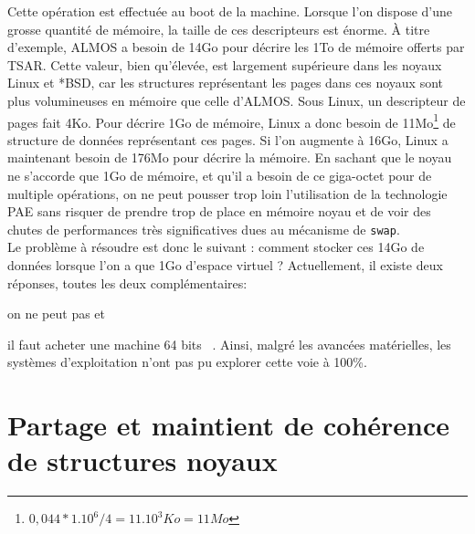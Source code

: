       Cette opération est effectuée au boot de la machine. Lorsque l’on dispose
      d’une grosse quantité de mémoire, la taille de ces descripteurs est
      énorme. À titre d’exemple, ALMOS a besoin de 14Go pour décrire les 1To de
      mémoire offerts par TSAR. Cette valeur, bien qu’élevée, est largement
      supérieure dans les noyaux Linux et *BSD, car les structures représentant
      les pages dans ces noyaux sont plus volumineuses en mémoire que celle
      d’ALMOS. Sous Linux, un descripteur de pages fait 4Ko. Pour décrire 1Go de
      mémoire, Linux a donc besoin de 11Mo\footnote{$0,044*1.10^6/4 = 11.10^3Ko
        = 11Mo$} de structure de données représentant ces pages. Si l'on
      augmente à 16Go, Linux a maintenant besoin de 176Mo pour décrire la
      mémoire. En sachant que le noyau ne s'accorde que 1Go de mémoire, et qu'il
      a besoin de ce giga-octet pour de multiple opérations, on ne peut pousser
      trop loin l'utilisation de la technologie PAE sans risquer de prendre trop
      de place en mémoire noyau et de voir des chutes de performances très
      significatives dues au mécanisme de \texttt{swap}.\\

      Le problème à résoudre est donc le suivant : comment stocker ces 14Go de
      données lorsque l’on a que 1Go d’espace virtuel ?  Actuellement, il existe
      deux réponses, toutes les deux complémentaires: \benumline \item on ne
      peut pas et \item il faut acheter une machine 64
      bits~\citep{gorman2004understanding} \eenumline. Ainsi, malgré les
      avancées matérielles, les systèmes d'exploitation n'ont pas pu explorer
      cette voie à 100\%.


  \section{Partage et maintient de cohérence de structures noyaux}
  \label{sec:consistency}
  




